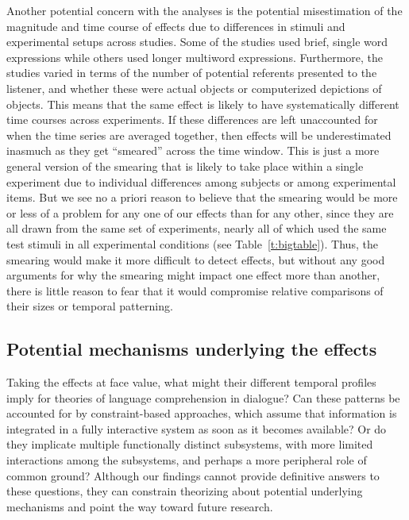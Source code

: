 \documentclass[doc,fignum,apacite,floatsintext]{apa6}
\begin{document}
Another potential concern with the analyses is the potential misestimation of the magnitude and time course of effects due to differences in stimuli and experimental setups across studies.  Some of the studies used brief, single word expressions while others used longer multiword expressions.  Furthermore, the studies varied in terms of the number of potential referents presented to the listener, and whether these were actual objects or computerized depictions of objects.  This means that the same effect is likely to have systematically different time courses across experiments.  If these differences are left unaccounted for when the time series are averaged together, then effects will be underestimated inasmuch as they get ``smeared'' across the time window.  This is just a more general version of the smearing that is likely to take place within a single experiment due to individual differences among subjects or among experimental items.  But we see no a priori reason to believe that the smearing would be more or less of a problem for any one of our effects than for any other, since they are all drawn from the same set of experiments, nearly all of which used the same test stimuli in all experimental conditions (see Table~\ref{t:bigtable}).  Thus, the smearing would make it more difficult to detect effects, but without any good arguments for why the smearing might impact one effect more than another, there is little reason to fear that it would compromise relative comparisons of their sizes or temporal patterning.

\subsection{Potential mechanisms underlying the effects}

Taking the effects at face value, what might their different temporal profiles imply for theories of language comprehension in dialogue?  Can these patterns be accounted for by constraint-based approaches, which assume that information is integrated in a fully interactive system as soon as it becomes available?  Or do they implicate multiple functionally distinct subsystems, with more limited interactions among the subsystems, and perhaps a more peripheral role of common ground?  Although our findings cannot provide definitive answers to these questions, they can constrain theorizing about potential underlying mechanisms and point the way toward future research.
\end{document}
